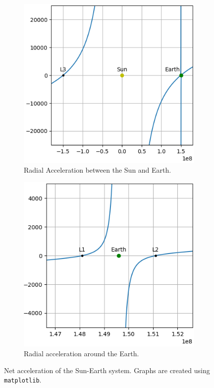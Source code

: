 \begin{figure}[h!]
	\centering
	\captionsetup[subfigure]{justification=centering}
	\begin{subfigure}[b]{0.4\textwidth}
		\centering
		\includegraphics[scale=0.6]{r-accel-figure-1.png}
		\caption{\footnotesize Radial Acceleration between the Sun and Earth.}
		\label{fig:radial-accel-system}
	\end{subfigure}
	\hspace*{1cm}
	\begin{subfigure}[b]{0.4\textwidth}
		\centering
		\includegraphics[scale=0.6]{r-accel-figure-2.png}
		\caption{\footnotesize Radial acceleration around the Earth.\vspace*{1.16em}}
		\label{fig:radial-accel-earth}
	\end{subfigure}
	\label{fig:radial-accel}
	\caption{Net acceleration of the Sun-Earth system. Graphs are created using \texttt{matplotlib}.}
\end{figure} %

